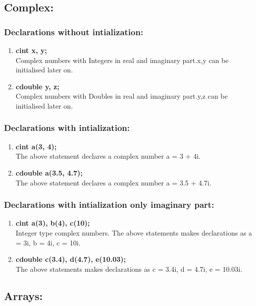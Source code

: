 \documentclass[12pt]{article}
\begin{document}
\subsection{Complex:}
\subsubsection{Declarations without intialization:}
\begin{enumerate}
    \item \textbf{cint x, y;}\\
    Complex numbers with Integers in real and imaginary part.x,y can be initialised later on.
    \item \textbf{cdouble y, z;} \\
    Complex numbers with Doubles in real and imaginary part.y,z can be initialised later on.
\end{enumerate}

\subsubsection{Declarations with intialization:}
\begin{enumerate}
    \item \textbf{cint a(3, 4);}\\
The above statement declares a complex number a = 3 + 4i.
    \item \textbf{cdouble a(3.5, 4.7);}\\
The above statement declares a complex number a = 3.5 + 4.7i.
\end{enumerate}
\subsubsection{Declarations with intialization only imaginary part:}
\begin{enumerate}
    \item \textbf{cint a(3), b(4), c(10);}\\
Integer type complex numbers.
The above statements makes declarations as a = 3i, b = 4i, c = 10i.
    \item \textbf{cdouble c(3.4), d(4.7), e(10.03);} \\
The above statements makes declarations as c = 3.4i, d = 4.7i, e = 10.03i.
\end{enumerate}
\subsection{Arrays:}
\end{document}
